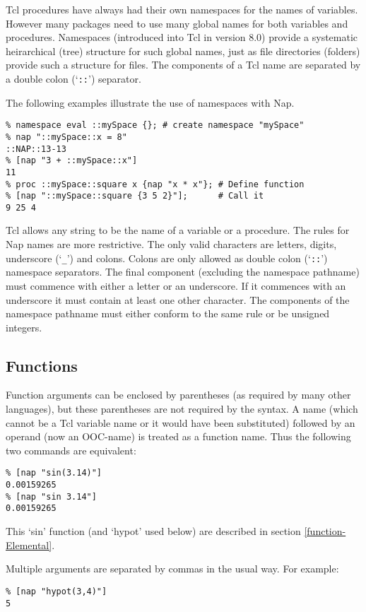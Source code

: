 Tcl procedures have always had their own namespaces for the names of variables.
However many packages need to use many global names for both variables and procedures.
Namespaces (introduced into Tcl in version 8.0)
provide a systematic heirarchical (tree) structure for such global names,
just as file directories (folders) provide such a structure for files.
The components of a Tcl name are separated by a double colon (`\texttt{::}') separator.

The following examples illustrate the use of namespaces with Nap.
\begin{verbatim}
% namespace eval ::mySpace {}; # create namespace "mySpace"
% nap "::mySpace::x = 8"
::NAP::13-13
% [nap "3 + ::mySpace::x"]
11
% proc ::mySpace::square x {nap "x * x"}; # Define function
% [nap "::mySpace::square {3 5 2}"];      # Call it
9 25 4
\end{verbatim}

Tcl allows any string to be the name of a variable or a procedure.
The rules for Nap names are more restrictive.
The only valid characters are letters, digits, underscore (`\texttt{\_}') and colons.
Colons are only allowed as double colon (`\texttt{::}') namespace separators.
The final component (excluding the namespace pathname) must commence with either a
letter or an underscore.
If it commences with an underscore it must contain at least one other character.
The components of the namespace pathname must either conform to the same rule or
be unsigned integers.

\subsection{Functions}
      \label{syntax-Functions}

Function arguments can be enclosed by parentheses (as required
    by many other languages), but these parentheses are not required by
    the syntax. A name (which cannot be a Tcl variable name or it would
    have been substituted) followed by an operand (now an OOC-name) is
    treated as a function name. Thus the following two commands are
    equivalent:
    \begin{verbatim}
% [nap "sin(3.14)"]
0.00159265
% [nap "sin 3.14"]
0.00159265
\end{verbatim}
This `sin' function (and `hypot' used below) are described in section \ref{function-Elemental}.

Multiple arguments are separated by commas in the usual way. For
    example:
    \begin{verbatim}
% [nap "hypot(3,4)"]
5
\end{verbatim}

